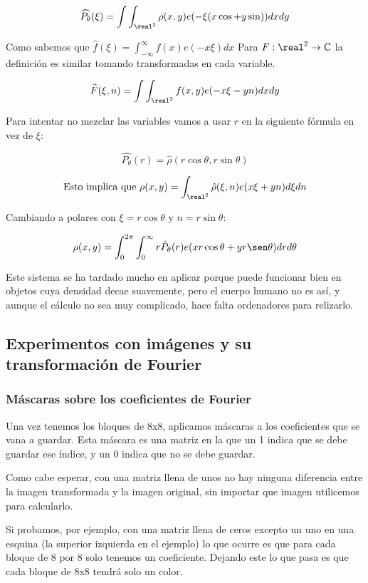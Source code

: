 	$$\widehat{P_{\theta}}(\xi) = \int\int_{\real^2} \rho(x,y) e(-\xi(x\cos + y\sin)) dxdy$$

	\obs Como sabemos que $\widehat{f}(\xi) = \int_{-\infty}^{\infty} f(x) e(-x\xi)dx$ Para $F : \real^2 \rightarrow \mathbb{C}$ la definición es similar tomando transformadas en cada variable.

	$$\widehat{F}(\xi , n) = \int \int_{\real^2} f(x,y) e (-x\xi -yn) dxdy$$

	Para intentar no mezclar las variables vamos a usar $r$ en la siguiente fórmula en vez de $\xi$:

	$$\hat{P_{\theta}} (r) = \hat{\rho} (r \cos \theta, r \sin \theta)$$

	$$ \text{Esto implica que } \rho (x,y) = \int_{\real^2} \hat{\rho}(\xi, n) e(x \xi + yn) d\xi dn $$

	Cambiando a polares con $\xi = r \cos \theta$ y $n = r \sin \theta$:

	$$ \rho (x,y) = \int^{2\pi}_{0} \int^{\infty}_{0} r \hat{P}_{\theta} (r) e (x r \cos \theta + y r \sen \theta) dr d\theta $$

	Este sistema se ha tardado mucho en aplicar porque puede funcionar bien en objetos cuya densidad decae suavemente, pero el cuerpo humano no es así, y aunque el cálculo no sea muy complicado, hace falta ordenadores para relizarlo.





\subsection{Experimentos con imágenes y su transformación de Fourier}

	\subsubsection{Máscaras sobre los coeficientes de Fourier}

		Una vez tenemos los bloques de 8x8, aplicamos máscaras a los coeficientes que se vana a guardar. Esta máscara es una matriz en la que un 1 indica que se debe guardar ese índice, y un 0 indica que no se debe guardar.

		Como cabe esperar, con una matriz llena de unos no hay ninguna diferencia entre la imagen transformada y la imagen original, sin importar que imagen utilicemos para calcularlo.

		Si probamos, por ejemplo, con una matriz llena de ceros excepto un uno en una esquina (la superior izquierda en el ejemplo) lo que ocurre es que para cada bloque de 8 por 8 solo tenemos un coeficiente. Dejando este lo que pasa es que cada bloque de 8x8 tendrá solo un color.

